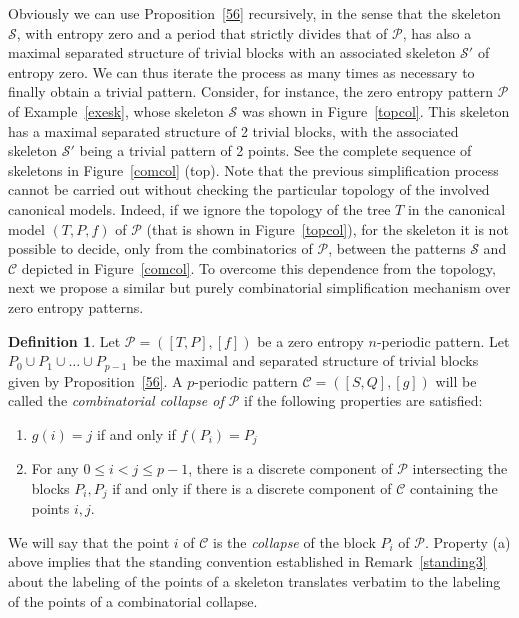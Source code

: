 \documentclass[a4paper]{amsart}
\theoremstyle{definition}
\newtheorem{defi}[theorem]{Definition}
\begin{document}
Obviously we can use Proposition~\ref{56} recursively, in the sense that the skeleton $\mathcal{S}$, with entropy
zero and a period that strictly divides that of $\mathcal{P}$, has also a maximal separated structure of trivial blocks
with an associated skeleton $\mathcal{S}'$ of entropy zero. We can thus iterate the process as many times as necessary
to finally obtain a trivial pattern. Consider, for instance, the zero entropy pattern $\mathcal{P}$ of Example~\ref{exesk},
whose skeleton $\mathcal{S}$ was shown in Figure~\ref{topcol}. This skeleton has a maximal separated structure of 2 trivial blocks,
with the associated skeleton $\mathcal{S}'$ being a trivial pattern of 2 points. See the complete sequence of skeletons
in Figure~\ref{comcol} (top). Note that the previous simplification process cannot be carried out without checking the
particular topology of the involved canonical models. Indeed, if we ignore the topology of the tree $T$ in the canonical
model $(T,P,f)$ of $\mathcal{P}$ (that is shown in Figure~\ref{topcol}), for the skeleton it is not possible to decide,
only from the combinatorics of $\mathcal{P}$, between the patterns $\mathcal{S}$ and $\mathcal{C}$ depicted in
Figure~\ref{comcol}. To overcome this dependence from the topology, next we propose a similar but purely combinatorial
simplification mechanism over zero entropy patterns.

\begin{defi}\label{combicolla}
Let $\mathcal{P}=([T,P],[f])$ be a zero entropy $n$-periodic pattern. Let $P_0\cup P_1\cup\ldots\cup P_{p-1}$ be the maximal
and separated structure of trivial blocks given by Proposition~\ref{56}. A $p$-periodic pattern $\mathcal{C}=([S,Q],[g])$ will
be called the \emph{combinatorial collapse of $\mathcal{P}$} if the following properties are satisfied:
\begin{enumerate}
\item[(a)] $g(i)=j$ if and only if $f(P_i)=P_j$
\item[(b)] For any $0\le i<j\le p-1$, there is a discrete component of $\mathcal{P}$ intersecting the blocks $P_i,P_j$ if
and only if there is a discrete component of $\mathcal{C}$ containing the points $i,j$.
\end{enumerate}
We will say that the point $i$ of $\mathcal{C}$ is the \emph{collapse} of the block $P_i$ of $\mathcal{P}$.
Property (a) above implies that the standing convention established in Remark~\ref{standing3} about the labeling of the
points of a skeleton translates verbatim to the labeling of the points of a combinatorial collapse.
\end{defi}
\end{document}
